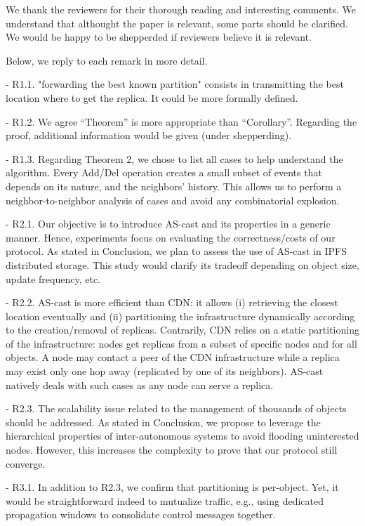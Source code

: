We thank the reviewers for their thorough reading  and interesting comments.
We understand that althought the paper is relevant, some parts should be clarified. We would be happy to be shepperded if reviewers believe it is relevant. 

Below, we reply to each remark in more detail.

- R1.1. "forwarding the best known partition"  consists in transmitting the best location where to get the replica.
It could be more formally defined.

- R1.2.  We agree ``Theorem'' is more appropriate than ``Corollary''. Regarding the proof, additional information would be given (under shepperding).

- R1.3. Regarding Theorem 2, we chose to list all cases to help understand the algorithm.
Every Add/Del operation creates a small subset of events that depends on its nature,
and the neighbors' history. This allows us to perform a neighbor-to-neighbor analysis of cases and avoid any combinatorial explosion.

- R2.1. Our objective is to introduce AS-cast and its properties in a generic manner. 
Hence, experiments focus on evaluating the correctness/costs of our protocol.
As stated in Conclusion, we plan to assess the use of AS-cast in IPFS distributed storage. This study would clarify its tradeoff depending on object size, update frequency, etc.

- R2.2. AS-cast is more efficient than CDN: it allows (i) retrieving the closest location eventually and (ii) partitioning the infrastructure dynamically according to the creation/removal of replicas. Contrarily, CDN relies on a static partitioning of the infrastructure: nodes get replicas from a subset of specific nodes and for all objects. A node may contact a peer of the CDN infrastructure while a replica may exist only one hop away (replicated by one of its neighbors). 
AS-cast natively deals with such cases as any node can serve a replica.

- R2.3.  The scalability issue related to the management of thousands of 
objects should be addressed. As stated in Conclusion, we propose to leverage the
hierarchical properties of inter-autonomous systems to avoid flooding uninterested nodes. 
However, this increases the complexity to prove that our protocol still converge.

- R3.1. In addition to  R2.3, we confirm that partitioning is per-object.
Yet, it would be straightforward indeed to mutualize traffic, e.g., using dedicated propagation windows to consolidate control messages together.

